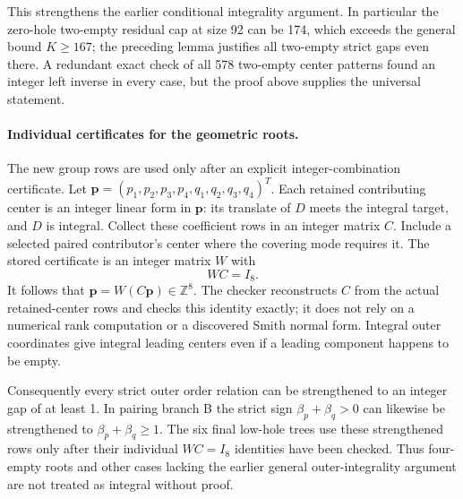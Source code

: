 \documentclass[11pt,a4paper]{article}
\theoremstyle{remark}
\newcommand{\Z}{\mathbb Z}
\begin{document}
This strengthens the earlier conditional integrality argument. In
particular the zero-hole two-empty residual cap at size 92 can be 174,
which exceeds the general bound $K\ge167$; the preceding lemma justifies
all two-empty strict gaps even there. A redundant exact check of all
578 two-empty center patterns found an integer left inverse in every
case, but the proof above supplies the universal statement.

\paragraph{Individual certificates for the geometric roots.}
The new group rows are used only after an explicit integer-combination
certificate. Let
$\mathbf p=(p_1,p_2,p_3,p_4,q_1,q_2,q_3,q_4)^T$.
Each retained contributing center is an integer linear form in
$\mathbf p$: its translate of $D$ meets the integral target, and $D$ is
integral. Collect these coefficient rows in an integer matrix $C$.
Include a selected paired contributor's center where the covering mode
requires it. The stored certificate is an integer matrix $W$ with
\[
 WC=I_8.
\]
It follows that $\mathbf p=W(C\mathbf p)\in\Z^8$. The checker reconstructs
$C$ from the actual retained-center rows and checks this identity exactly;
it does not rely on a numerical rank computation or a discovered Smith
normal form. Integral outer coordinates give integral leading centers
even if a leading component happens to be empty.

Consequently every strict outer order relation can be strengthened to
an integer gap of at least 1. In pairing branch B the strict sign
$\beta_p+\beta_q>0$ can likewise be strengthened to
$\beta_p+\beta_q\ge1$. The six final low-hole trees use these strengthened
rows only after their individual $WC=I_8$ identities have been checked.
Thus four-empty roots and other cases lacking the earlier general
outer-integrality argument are not treated as integral without proof.
\end{document}
